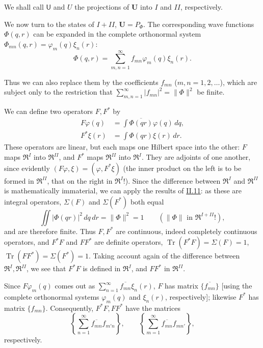 \documentclass[fontsize=13pt,twoside,openany,headings=normal,parskip=false,bookmarkpackage=false,DIV=calc]{scrbook}
\begin{document}
We shall call $\mathsf U$ and $U$ the projections of $\boldsymbol U$ into $I$ and $II$, respectively.

We now turn to the states of $I+II$, $\boldsymbol U=P_\Phi$. The corresponding wave functions $\Phi(q,r)$ can be expanded in the complete orthonormal system $\Phi_{mn}(q,r)=\varphi_m(q)\xi_n(r)$:
\[
 \Phi(q,r)=\sum_{m,n=1}^{\infty}f_{mn}\varphi_m(q)\xi_n(r).
\]

Thus we can also replace them by the coefficients $f_{mn}$ ($m,n=1,2,\ldots$), which are subject only to the restriction that $\sum_{m,n=1}^{\infty}|f_{mn}|^2=\|\Phi\|^2$ be finite.

We can define two operators $F,F^*$ by
\begin{align*}
 F\varphi(q)&=\int\overline{\Phi(qr)}\varphi(q)\,dq,\\
 F^*\xi(r)&=\int\Phi(qr)\xi(r)\,dr.
\end{align*}
These operators are linear, but each maps one Hilbert space into the other: $F$ maps $\mathfrak R^I$ into $\mathfrak R^{II}$, and $F^*$ maps $\mathfrak R^{II}$ into $\mathfrak R^I$. They are adjoints of one another, since evidently $(F\varphi,\xi)=(\varphi,F^*\xi)$ (the inner product on the left is to be formed in $\mathfrak R^{II}$, that on the right in $\mathfrak R^I$!). Since the difference between $\mathfrak R^I$ and $\mathfrak R^{II}$ is mathematically immaterial, we can apply the results of \hyperref[sec:II.11]{II.11}: as these are integral operators, $\Sigma(F)$ and $\Sigma(F^*)$ both equal
\[
 \iint|\Phi(qr)|^2\,dq\,dr=\|\Phi\|^2=1
 \qquad(\|\Phi\|\text{ in }\mathfrak R^{I+II}!),
\]
and are therefore finite. Thus $F,F^*$ are continuous, indeed completely continuous operators, and $F^*F$ and $FF^*$ are definite operators, $\operatorname{Tr}(F^*F)=\Sigma(F)=1$, $\operatorname{Tr}(FF^*)=\Sigma(F^*)=1$. Taking account again of the difference between $\mathfrak R^I,\mathfrak R^{II}$, we see that $F^*F$ is defined in $\mathfrak R^I$, and $FF^*$ in $\mathfrak R^{II}$.

Since $F\varphi_m(q)$ comes out as $\sum_{n=1}^{\infty}\overline{f_{mn}}\xi_n(r)$, $F$ has matrix $\{\overline{f_{mn}}\}$ [using the complete orthonormal systems $\varphi_m(q)$ and $\xi_n(r)$, respectively]; likewise $F^*$ has matrix $\{f_{mn}\}$. Consequently, $F^*F,FF^*$ have the matrices
\[
 \left\{\sum_{n=1}^{\infty}\overline{f_{mn}}f_{m'n}\right\},\qquad
 \left\{\sum_{m=1}^{\infty}\overline{f_{mn}}f_{mn'}\right\},
\]
respectively.
\hypertarget{origpage-230}{}%
\end{document}
